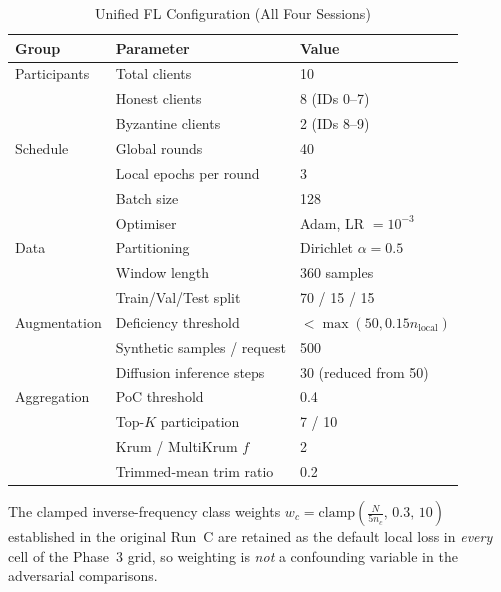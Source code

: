 \documentclass[11pt,a4paper]{article}
\begin{document}
\begin{table}[H]
\centering
\caption{Unified FL Configuration (All Four Sessions)}
\label{tab:flconfig}
\begin{tabular}{@{}lll@{}}
\toprule
\textbf{Group} & \textbf{Parameter} & \textbf{Value} \\
\midrule
Participants      & Total clients               & 10 \\
                  & Honest clients              & 8 (IDs 0--7) \\
                  & Byzantine clients           & 2 (IDs 8--9) \\
\midrule
Schedule          & Global rounds               & 40 \\
                  & Local epochs per round      & 3 \\
                  & Batch size                  & 128 \\
                  & Optimiser                   & Adam, LR $=10^{-3}$ \\
\midrule
Data              & Partitioning                & Dirichlet $\alpha=0.5$ \\
                  & Window length               & 360 samples \\
                  & Train/Val/Test split        & 70 / 15 / 15 \\
\midrule
Augmentation      & Deficiency threshold        & $< \max(50, 0.15 n_{\text{local}})$ \\
                  & Synthetic samples / request & 500 \\
                  & Diffusion inference steps   & 30 (reduced from 50) \\
\midrule
Aggregation       & PoC threshold               & 0.4 \\
                  & Top-$K$ participation       & 7 / 10 \\
                  & Krum / MultiKrum $f$        & 2 \\
                  & Trimmed-mean trim ratio     & 0.2 \\
\bottomrule
\end{tabular}
\end{table}

The clamped inverse-frequency class weights
$w_c = \text{clamp}\!\left(\frac{N}{5 n_c},\,0.3,\,10\right)$ established
in the original Run~C are retained as the default local loss in
\textit{every} cell of the Phase~3 grid, so weighting is \textit{not} a
confounding variable in the adversarial comparisons.
\end{document}
